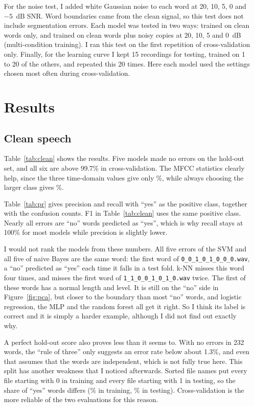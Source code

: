\documentclass[11pt,a4paper]{article}
\begin{document}
For the noise test, I added white Gaussian noise to each word at 20, 10, 5, 0 and $-5$~dB SNR. Word boundaries came from the clean signal, so this test does not include segmentation errors. Each model was tested in two ways: trained on clean words only, and trained on clean words plus noisy copies at 20, 10, 5 and 0~dB (multi-condition training). I ran this test on the first repetition of cross-validation only. Finally, for the learning curve I kept 15 recordings for testing, trained on 1 to 20 of the others, and repeated this 20 times. Here each model used the settings chosen most often during cross-validation.

\section{Results}
\subsection{Clean speech}
Table~\ref{tab:clean} shows the results. Five models made no errors on the hold-out set, and all six are above 99.7\% in cross-validation. The MFCC statistics clearly help, since the three time-domain values give only \TimeBase\%, while always choosing the larger class gives \Major\%.



Table~\ref{tab:pr} gives precision and recall with ``yes'' as the positive class, together with the confusion counts. F1 in Table~\ref{tab:clean} uses the same positive class. Nearly all errors are ``no'' words predicted as ``yes'', which is why recall stays at 100\% for most models while precision is slightly lower.



I would not rank the models from these numbers. All five errors of the SVM and all five of naive Bayes are the same word: the first word of \texttt{0\_0\_1\_0\_1\_0\_0\_0.wav}, a ``no'' predicted as ``yes'' each time it falls in a test fold. k-NN misses this word four times, and misses the first word of \texttt{1\_1\_0\_0\_1\_0\_1\_0.wav} twice. The first of these words has a normal length and level. It is still on the ``no'' side in Figure~\ref{fig:pca}, but closer to the boundary than most ``no'' words, and logistic regression, the MLP and the random forest all get it right. So I think its label is correct and it is simply a harder example, although I did not find out exactly why.

A perfect hold-out score also proves less than it seems to. With no errors in 232 words, the ``rule of three'' only suggests an error rate below about 1.3\%, and even that assumes that the words are independent, which is not fully true here. This split has another weakness that I noticed afterwards. Sorted file names put every file starting with 0 in training and every file starting with 1 in testing, so the share of ``yes'' words differs (\TrainYes\% in training, \TestYes\% in testing). Cross-validation is the more reliable of the two evaluations for this reason.
\end{document}
